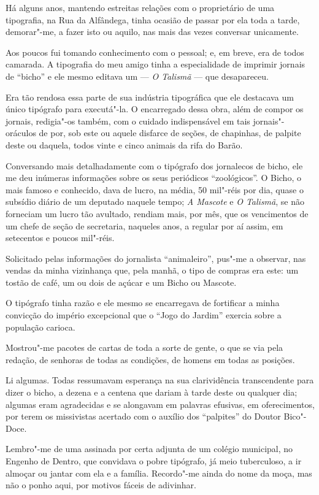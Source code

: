Há alguns anos, mantendo estreitas relações com o proprietário de uma
tipografia, na Rua da Alfândega, tinha ocasião de passar por ela toda a
tarde, demorar"-me, a fazer isto ou aquilo, nas mais das vezes conversar
unicamente.

Aos poucos fui tomando conhecimento com o pessoal; e, em breve, era de
todos camarada. A tipografia do meu amigo tinha a especialidade de
imprimir jornais de ``bicho'' e ele mesmo editava um --- \emph{O Talismã}
--- que desapareceu.

Era tão rendosa essa parte de sua indústria tipográfica que ele
destacava um único tipógrafo para executá"-la. O encarregado dessa obra,
além de compor os jornais, redigia"-os também, com o cuidado
indispensável em tais jornais"-oráculos de por, sob este ou aquele
disfarce de seções, de chapinhas, de palpite deste ou daquela, todos
vinte e cinco animais da rifa do Barão.

Conversando mais detalhadamente com o tipógrafo dos jornalecos de bicho,
ele me deu inúmeras informações sobre os seus periódicos ``zoológicos''.
O Bicho, o mais famoso e conhecido, dava de lucro, na média, 50 mil"-réis
por dia, quase o subsídio diário de um deputado naquele tempo; \emph{A
Mascote} e \emph{O Talismã}, se não forneciam um lucro tão avultado,
rendiam mais, por mês, que os vencimentos de um chefe de seção de
secretaria, naqueles anos, a regular por aí assim, em setecentos e
poucos mil"-réis.

Solicitado pelas informações do jornalista ``animaleiro'', pus"-me a
observar, nas vendas da minha vizinhança que, pela manhã, o tipo de
compras era este: um tostão de café, um ou dois de açúcar e um Bicho ou
Mascote.

O tipógrafo tinha razão e ele mesmo se encarregava de fortificar a minha
convicção do império excepcional que o ``Jogo do Jardim'' exercia sobre
a população carioca.

Mostrou"-me pacotes de cartas de toda a sorte de gente, o que se via pela
redação, de senhoras de todas as condições, de homens em todas as
posições.

Li algumas. Todas ressumavam esperança na sua clarividência
transcendente para dizer o bicho, a dezena e a centena que dariam à
tarde deste ou qualquer dia; algumas eram agradecidas e se alongavam em
palavras efusivas, em oferecimentos, por terem os missivistas acertado
com o auxílio dos ``palpites'' do Doutor Bico"-Doce.

Lembro"-me de uma assinada por certa adjunta de um colégio municipal, no
Engenho de Dentro, que convidava o pobre tipógrafo, já meio tuberculoso,
a ir almoçar ou jantar com ela e a família. Recordo"-me ainda do nome da
moça, mas não o ponho aqui, por motivos fáceis de adivinhar.

